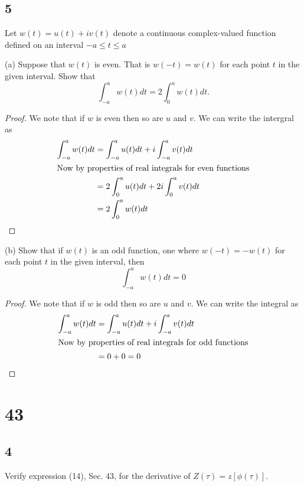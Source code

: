\documentclass{article}
\begin{document}
\subsection*{5} %
Let $w(t) = u(t) + iv(t)$ denote a continuous complex-valued function defined
on an interval $-a \leq t \leq a$

(a) Suppose that $w(t)$ is even. That is $w(-t) = w(t)$ for each point $t$ in
the given interval. Show that
$$\int_{-a}^a w(t) dt = 2\int_0^aw(t) dt.$$

\begin{proof}
    We note that if $w$ is even then so are $u$ and $v$.
    We can write the intergral as
    \begin{align*}
        \int_{-a}^a w(t) dt & = \int_{-a}^a u(t) dt + i\int_{-a}^a v(t) dt \\
        \intertext{Now by properties of real integrals for even functions}
                            & = 2\int_0^a u(t) dt + 2i\int_0^a v(t) dt     \\
                            & = 2\int_0^a w(t) dt
    \end{align*}
\end{proof}

(b) Show that if $w(t)$ is an odd function, one where $w(-t) = -w(t)$ for each
point $t$ in the given interval, then
$$\int_{-a}^a w(t) dt = 0$$

\begin{proof}
    We note that if $w$ is odd then so are $u$ and $v$.
    We can write the integral as
    \begin{align*}
        \int_{-a}^a w(t) dt & = \int_{-a}^a u(t) dt + i\int_{-a}^a v(t) dt \\
        \intertext{Now by properties of real integrals for odd functions}
                            & = 0 + 0 = 0
    \end{align*}
\end{proof}

\section*{43}
\subsection*{4} %
Verify expression (14), Sec. 43, for the derivative of $Z(\tau) = z[\phi(\tau)]$.
\end{document}
